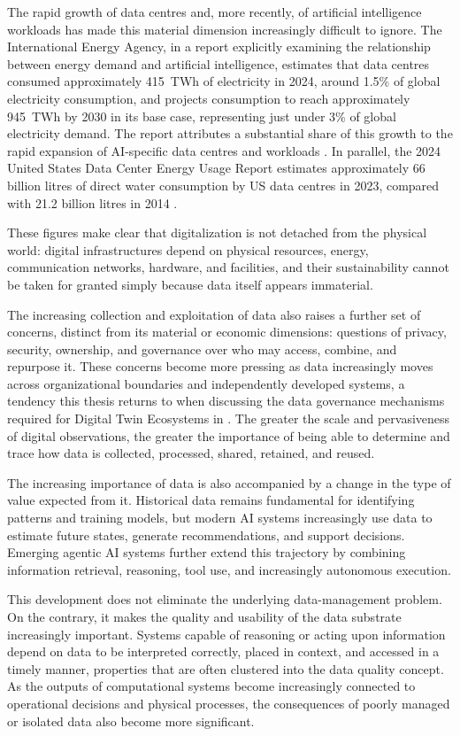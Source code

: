 The rapid growth of data centres and, more recently, of artificial intelligence workloads has made this material dimension increasingly difficult to ignore. The International Energy Agency, in a report explicitly examining the relationship between energy demand and artificial intelligence, estimates that data centres consumed approximately 415~TWh of electricity in 2024, around 1.5\% of global electricity consumption, and projects consumption to reach approximately 945~TWh by 2030 in its base case, representing just under 3\% of global electricity demand. The report attributes a substantial share of this growth to the rapid expansion of AI-specific data centres and workloads \cite{iea2025}. In parallel, the 2024 United States Data Center Energy Usage Report estimates approximately 66 billion litres of direct water consumption by US data centres in 2023, compared with 21.2 billion litres in 2014 \cite{shehabi2024}.

These figures make clear that digitalization is not detached from the physical world: digital infrastructures depend on physical resources, energy, communication networks, hardware, and facilities, and their sustainability cannot be taken for granted simply because data itself appears immaterial.

The increasing collection and exploitation of data also raises a further set of concerns, distinct from its material or economic dimensions: questions of privacy, security, ownership, and governance over who may access, combine, and repurpose it. These concerns become more pressing as data increasingly moves across organizational boundaries and independently developed systems, a tendency this thesis returns to when discussing the data governance mechanisms required for Digital Twin Ecosystems in . The greater the scale and pervasiveness of digital observations, the greater the importance of being able to determine and trace how data is collected, processed, shared, retained, and reused.

The increasing importance of data is also accompanied by a change in the type of value expected from it. Historical data remains fundamental for identifying patterns and training models, but modern AI systems increasingly use data to estimate future states, generate recommendations, and support decisions. Emerging agentic AI systems further extend this trajectory by combining information retrieval, reasoning, tool use, and increasingly autonomous execution.

This development does not eliminate the underlying data-management problem. On the contrary, it makes the quality and usability of the data substrate increasingly important. Systems capable of reasoning or acting upon information depend on data to be interpreted correctly, placed in context, and accessed in a timely manner, properties that are often clustered into the data quality concept. As the outputs of computational systems become increasingly connected to operational decisions and physical processes, the consequences of poorly managed or isolated data also become more significant.

